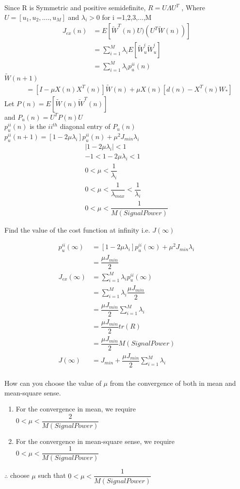 \documentclass[journal,12pt,twocolumn]{IEEEtran}
\begin{document}
Since R is Symmetric and positive semidefinite,
$ R=U \Lambda U^{T}$ , Where $U = [u_1,u_2,....,u_M]$ and $\lambda_i > 0$ for i =1,2,3,...,M
\begin{align*}
J_{ex}(n) &= E[\tilde W^{T}(n) U)(U^{T} \tilde W(n))]\\
&=\sum_{i=1}^{M} \lambda_i E[\tilde W^{i}_u \tilde W^{i}_u]\\
&=\sum_{i=1}^{M} \lambda_i p_u^{ii}(n)
\end{align*}
$\tilde W(n+1)$
\begin{align*}
&=[I - \mu X(n) X^{T}(n)]\tilde W(n) + \mu X(n)[d(n)-X^{T}(n) W_{*}]
\end{align*} 
Let $P(n)= E[\tilde W(n)\tilde W^{T}(n)]$ \\and
$P_u(n)=U^{T}P(n)U $\\
$p_u^{ii}(n)$ is the $ii^{th}$ diagonal entry of $P_u(n)$\\
$p_u^{ii}(n+1)= [1-2 \mu \lambda_i]p_u^{ii}(n) + \mu^{2} J_{min} \lambda_i $
\begin{align*}
\mid 1-2 \mu \lambda_i \mid < 1\\
-1 < 1-2 \mu \lambda_i <1 \\
0 < \mu < \dfrac{1}{\lambda_i}\\
0 < \mu < \dfrac{1}{\lambda_{max}}< \dfrac{1}{\lambda_i}\\
 0 < \mu < \dfrac{1}{M(Signal Power)}
\end{align*}
\begin{problem}
Find the value of the cost function at infinity i.e. $J(\infty)$
\end{problem}
\solution
\begin{align*}
p_u^{ii}(\infty)&= [1-2 \mu \lambda_i]p_u^{ii}(\infty) + \mu^{2} J_{min} \lambda_i \\
&=\dfrac{\mu J_{min}}{2}\\
J_{ex}(\infty) &= \sum_{i=1}^{M} \lambda_i p_u^{ii}(\infty)\\
&=\sum_{i=1}^{M} \lambda_i\dfrac{\mu J_{min}}{2} \\
&=\dfrac{\mu J_{min}}{2}\sum_{i=1}^{M} \lambda_i \\
&=\dfrac{\mu J_{min}}{2} tr(R) \\
&= \dfrac{\mu J_{min}}{2} M(Signal Power) \\
J(\infty) &= J_{min} + \dfrac{\mu J_{min}}{2}\sum_{i=1}^{M} \lambda_i \\
\end{align*}
\begin{problem}
How can you choose the value of $\mu$ from the convergence of both in mean and mean-square sense.
\end{problem}
\solution
\begin{enumerate}
\item For the convergence in mean, we require \\
  $0 < \mu < \dfrac{2}{M(Signal Power)} $
\item For the convergence in mean-square sense, we require \\  
$0 < \mu < \dfrac{1}{M(Signal Power)} $
\end{enumerate}
$\therefore$ choose  $\mu$ such that 
$0 < \mu < \dfrac{1}{M(Signal Power)} $
\end{document}
